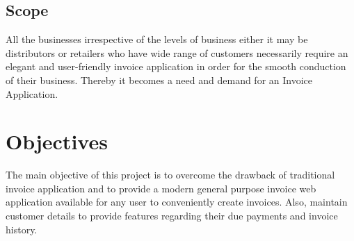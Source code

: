 \subsection{Scope}
All the businesses irrespective of the levels of business either it may be distributors or retailers who have wide range of customers necessarily require an elegant and user-friendly invoice application in order for the smooth conduction of their business. Thereby it becomes a need and demand for an Invoice Application.\\[0.5cm]


\section{Objectives}
The main objective of this project is to overcome the drawback of traditional invoice application and to provide a modern general purpose invoice web application available for any user to conveniently create invoices. Also, maintain customer details to provide features regarding their due payments and invoice history.